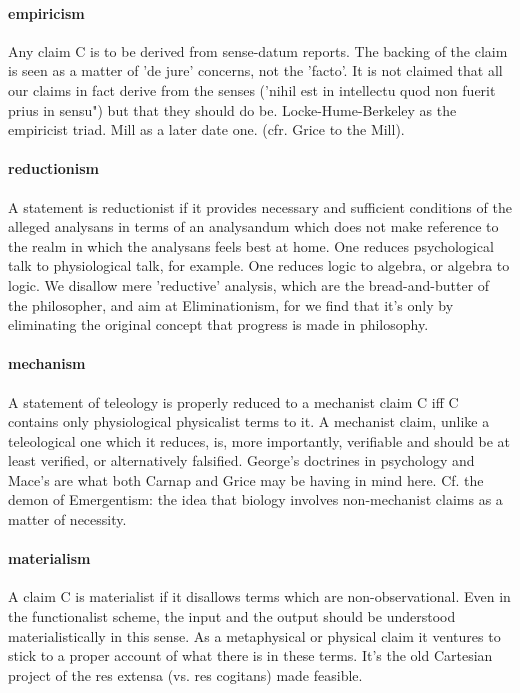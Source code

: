 \documentclass[10pt,titlepage]{book}
\begin{document}
\paragraph{empiricism} Any claim C is to be derived from sense-datum reports. The  
backing of the claim is seen as a matter of 'de jure' concerns, not the 
'facto'.  It is not claimed that all our claims in fact derive from the senses 
('nihil est  in intellectu quod non fuerit prius in sensu") but that they 
should do be.  Locke-Hume-Berkeley as the empiricist triad. Mill as a later date 
one. (cfr.  Grice to the Mill).
 
\paragraph{reductionism} A statement is reductionist if it provides necessary and  
sufficient conditions of the alleged analysans in terms of an analysandum which 
 does not make reference to the realm in which the analysans feels best at 
home.  One reduces psychological talk to physiological talk, for example. 
One reduces  logic to algebra, or algebra to logic. We disallow mere 
'reductive' analysis,  which are the bread-and-butter of the philosopher, and aim at 
Eliminationism,  for we find that it's only by eliminating the original 
concept that progress is  made in philosophy.
 
\paragraph{mechanism} A statement of teleology is properly reduced to a mechanist  
claim C iff C contains only physiological physicalist terms to it. A mechanist  
claim, unlike a teleological one which it reduces, is, more importantly,  
verifiable and should be at least verified, or alternatively falsified. 
George's  doctrines in psychology and Mace's are what both Carnap and Grice may 
be having  in mind here. Cf. the demon of Emergentism: the idea that biology 
involves  non-mechanist claims as a matter of necessity.
 
\paragraph{materialism} A claim C is materialist if it disallows terms which are  
non-observational. Even in the functionalist scheme, the input and the output  
should be understood materialistically in this sense. As a metaphysical or  
physical claim it ventures to stick to a proper account of what there is in  
these terms. It's the old Cartesian project of the res extensa (vs. res  
cogitans) made feasible.
 
\end{document}
